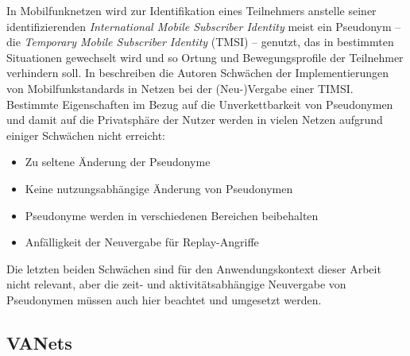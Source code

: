 In Mobilfunknetzen wird zur Identifikation eines Teilnehmers anstelle seiner identifizierenden \textit{International Mobile Subscriber Identity} meist ein Pseudonym -- die \textit{Temporary Mobile Subscriber Identity} (TMSI) -- genutzt, das in bestimmten Situationen gewechselt wird und so Ortung und Bewegungsprofile der Teilnehmer verhindern soll.
In \cite{arapinis2014} beschreiben die Autoren Schwächen der Implementierungen von Mobilfunkstandards in Netzen bei der (Neu-)Vergabe einer TIMSI. Bestimmte Eigenschaften im Bezug auf die Unverkettbarkeit von Pseudonymen und damit auf die Privatsphäre der Nutzer werden in vielen Netzen aufgrund einiger Schwächen nicht erreicht:
\begin{itemize}
  \item Zu seltene Änderung der Pseudonyme
  \item Keine nutzungsabhängige Änderung von Pseudonymen
  \item Pseudonyme werden in verschiedenen Bereichen beibehalten
  \item Anfälligkeit der Neuvergabe für Replay-Angriffe
\end{itemize}
Die letzten beiden Schwächen sind für den Anwendungskontext dieser Arbeit nicht relevant, aber die zeit- und aktivitätsabhängige Neuvergabe von Pseudonymen müssen auch hier beachtet und umgesetzt werden.

\subsection{VANets}

